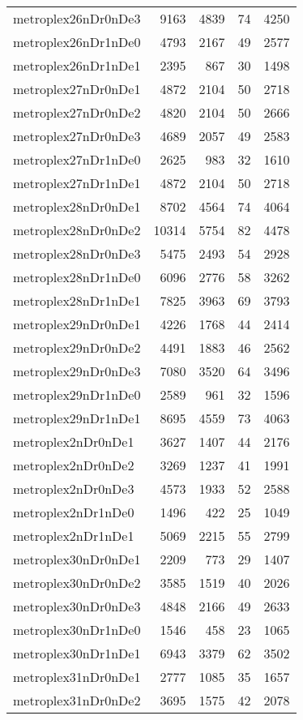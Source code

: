 \begin{longtable}{lrrrr}
metroplex26nDr0nDe3 & 9163 & 4839 & 74 & 4250 \\
metroplex26nDr1nDe0 & 4793 & 2167 & 49 & 2577 \\
metroplex26nDr1nDe1 & 2395 & 867 & 30 & 1498 \\
metroplex27nDr0nDe1 & 4872 & 2104 & 50 & 2718 \\
metroplex27nDr0nDe2 & 4820 & 2104 & 50 & 2666 \\
metroplex27nDr0nDe3 & 4689 & 2057 & 49 & 2583 \\
metroplex27nDr1nDe0 & 2625 & 983 & 32 & 1610 \\
metroplex27nDr1nDe1 & 4872 & 2104 & 50 & 2718 \\
metroplex28nDr0nDe1 & 8702 & 4564 & 74 & 4064 \\
metroplex28nDr0nDe2 & 10314 & 5754 & 82 & 4478 \\
metroplex28nDr0nDe3 & 5475 & 2493 & 54 & 2928 \\
metroplex28nDr1nDe0 & 6096 & 2776 & 58 & 3262 \\
metroplex28nDr1nDe1 & 7825 & 3963 & 69 & 3793 \\
metroplex29nDr0nDe1 & 4226 & 1768 & 44 & 2414 \\
metroplex29nDr0nDe2 & 4491 & 1883 & 46 & 2562 \\
metroplex29nDr0nDe3 & 7080 & 3520 & 64 & 3496 \\
metroplex29nDr1nDe0 & 2589 & 961 & 32 & 1596 \\
metroplex29nDr1nDe1 & 8695 & 4559 & 73 & 4063 \\
metroplex2nDr0nDe1 & 3627 & 1407 & 44 & 2176 \\
metroplex2nDr0nDe2 & 3269 & 1237 & 41 & 1991 \\
metroplex2nDr0nDe3 & 4573 & 1933 & 52 & 2588 \\
metroplex2nDr1nDe0 & 1496 & 422 & 25 & 1049 \\
metroplex2nDr1nDe1 & 5069 & 2215 & 55 & 2799 \\
metroplex30nDr0nDe1 & 2209 & 773 & 29 & 1407 \\
metroplex30nDr0nDe2 & 3585 & 1519 & 40 & 2026 \\
metroplex30nDr0nDe3 & 4848 & 2166 & 49 & 2633 \\
metroplex30nDr1nDe0 & 1546 & 458 & 23 & 1065 \\
metroplex30nDr1nDe1 & 6943 & 3379 & 62 & 3502 \\
metroplex31nDr0nDe1 & 2777 & 1085 & 35 & 1657 \\
metroplex31nDr0nDe2 & 3695 & 1575 & 42 & 2078 \\

\end{longtable}
